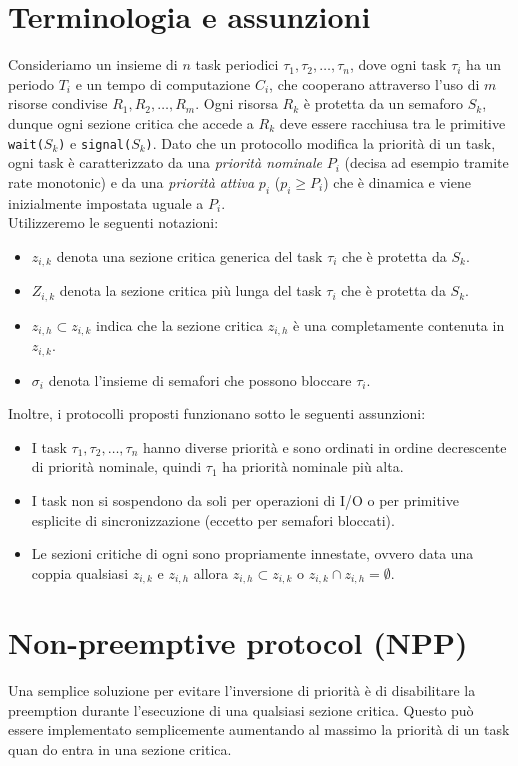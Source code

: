 \documentclass[12pt,openany,onesided]{book}
\begin{document}
\section{Terminologia e assunzioni}
Consideriamo un insieme di $n$ task periodici $\tau_1,\tau_2,\dots,\tau_n$, dove ogni task $\tau_i$ ha un periodo $T_i$ e un tempo di computazione $C_i$, che cooperano
attraverso l'uso di $m$ risorse condivise $R_1,R_2,\dots,R_m$.
Ogni risorsa $R_k$ è protetta da un semaforo $S_k$, dunque ogni sezione critica che accede a $R_k$ deve essere racchiusa tra le primitive \texttt{wait($S_k$)} e \texttt{signal($S_k$)}.
Dato che un protocollo modifica la priorità di un task, ogni task è caratterizzato da una \textit{priorità nominale} $P_i$ (decisa ad esempio tramite rate monotonic)
e da una \textit{priorità attiva} $p_i$ ($p_i \geq P_i$) che è dinamica e viene inizialmente impostata uguale a $P_i$.
\\
Utilizzeremo le seguenti notazioni:
\begin{itemize}
    \item $z_{i,k}$ denota una sezione critica generica del task $\tau_i$ che è protetta da $S_k$.
    \item $Z_{i,k}$ denota la sezione critica più lunga del task $\tau_i$ che è protetta da $S_k$.
    \item $z_{i,h}\subset z_{i,k}$ indica che la sezione critica $z_{i,h}$ è una completamente contenuta in $z_{i,k}$.
    \item $\sigma_i$ denota l'insieme di semafori che possono bloccare $\tau_i$.
\end{itemize}
Inoltre, i protocolli proposti funzionano sotto le seguenti assunzioni:
\begin{itemize}
    \item I task $\tau_1,\tau_2,\dots,\tau_n$ hanno diverse priorità e sono ordinati in ordine decrescente di priorità nominale, quindi $\tau_1$ ha priorità nominale più alta.
    \item I task non si sospendono da soli per operazioni di I/O o per primitive esplicite di sincronizzazione (eccetto per semafori bloccati).
    \item Le sezioni critiche di ogni sono propriamente innestate, ovvero data una coppia qualsiasi $z_{i,k}$ e $z_{i,h}$ allora $z_{i,h}\subset z_{i,k}$ o $z_{i,k}\cap z_{i,h}=\emptyset$.
\end{itemize}
\section{Non-preemptive protocol (NPP)}
Una semplice soluzione per evitare l'inversione di priorità è di disabilitare la preemption durante l'esecuzione di una qualsiasi sezione critica.
Questo può essere implementato semplicemente aumentando al massimo la priorità di un task quan do entra in una sezione critica.
\end{document}
